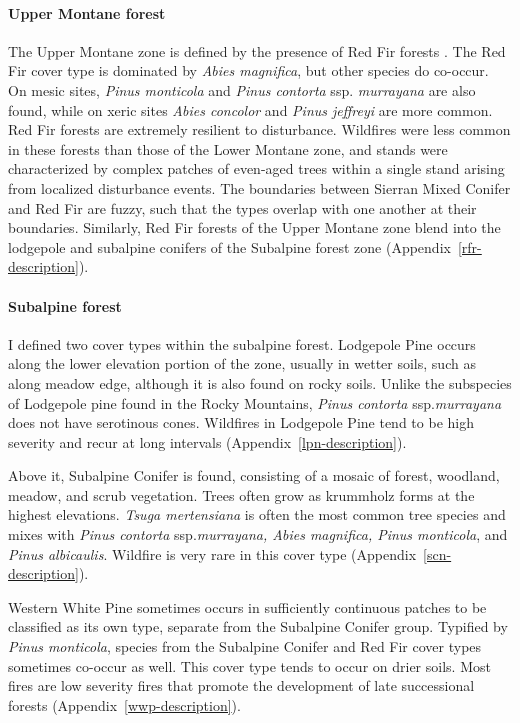 \paragraph*{Upper Montane forest} The Upper Montane zone is defined by the presence of Red Fir forests \citep{Potter1998}. The Red Fir cover type is dominated by \emph{Abies magnifica}, but other species do co-occur. On mesic sites, \emph{Pinus monticola} and \emph{Pinus contorta} ssp. \emph{murrayana} are also found, while on xeric sites \emph{Abies concolor} and \emph{Pinus jeffreyi} are more common. Red Fir forests are extremely resilient to disturbance. Wildfires were less common in these forests than those of the Lower Montane zone, and stands were characterized by complex patches of even-aged trees within a single stand arising from localized disturbance events. The boundaries between Sierran Mixed Conifer and Red Fir are fuzzy, such that the types overlap with one another at their boundaries. Similarly, Red Fir forests of the Upper Montane zone blend into the lodgepole and subalpine conifers of the Subalpine forest zone (Appendix~\ref{rfr-description}).


\paragraph*{Subalpine forest} I defined two cover types within the subalpine forest. Lodgepole Pine occurs along the lower elevation portion of the zone, usually in wetter soils, such as along meadow edge, although it is also found on rocky soils. Unlike the subspecies of Lodgepole pine found in the Rocky Mountains, \emph{Pinus contorta} ssp.\@ \emph{murrayana} does not have serotinous cones. Wildfires in Lodgepole Pine tend to be high severity and recur at long intervals (Appendix~\ref{lpn-description}).%

Above it, Subalpine Conifer is found, consisting of a mosaic of forest, woodland, meadow, and scrub vegetation. Trees often grow as krummholz forms at the highest elevations. \emph{Tsuga mertensiana} is often the most common tree species and mixes with \emph{Pinus contorta} ssp.\@ \emph{murrayana, Abies magnifica, Pinus monticola}, and \emph{Pinus albicaulis}. Wildfire is very rare in this cover type (Appendix~\ref{scn-description}). 

Western White Pine sometimes occurs in sufficiently continuous patches to be classified as its own type, separate from the Subalpine Conifer group. Typified by \emph{Pinus monticola}, species from the Subalpine Conifer and Red Fir cover types sometimes co-occur as well. This cover type tends to occur on drier soils. Most fires are low severity fires that promote the development of late successional forests (Appendix~\ref{wwp-description}).


